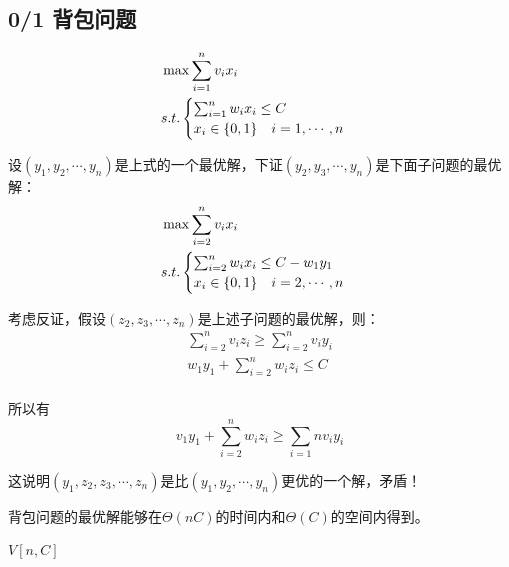 \documentclass[./../main.tex]{subfiles}
\begin{document}
\subsection{0/1 背包问题}
\begin{align*}
    &\max \sum_{i=1}^nv_ix_i\\
    &s.t.\begin{cases}
        $$
            \sum_{i=1}^nw_ix_i \leq C\\
            x_i \in \{0,1\}\quad i=1,\cdots,n
        $$
    \end{cases}
\end{align*}

设$(y_1,y_2,\cdots,y_n)$是上式的一个最优解，下证$(y_2,y_3,\cdots,y_n)$是下面子问题的最优解：
\begin{align*}
    &\max \sum_{i=2}^nv_ix_i\\
    &s.t.\begin{cases}
        $$
            \sum_{i=2}^nw_ix_i \leq C - w_1y_1\\
            x_i \in \{0,1\}\quad i=2,\cdots,n
        $$
    \end{cases}
\end{align*}

考虑反证，假设$(z_2,z_3,\cdots,z_n)$是上述子问题的最优解，则：
\begin{align*}
    \sum_{i=2}^nv_iz_i\ge\sum_{i=2}^nv_iy_i\\
    w_1y_1+\sum_{i=2}^nw_iz_i\le C\\
\end{align*}

所以有
\[
    v_1y_1+\sum_{i=2}^nw_iz_i\ge \sum_{i=1}{n}v_iy_i
\]

这说明$(y_1,z_2,z_3,\cdots,z_n)$是比$(y_1,y_2,\cdots,y_n)$更优的一个解，矛盾！

背包问题的最优解能够在$\Theta(nC)$的时间内和$\Theta(C)$的空间内得到。

\begin{algorithm}[t]
    \BlankLine
    \Return $V[n,C]$\;
    \caption{KNAPSACK算法}
\end{algorithm}
\end{document}
